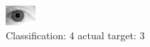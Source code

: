 \begin{figure}[h!]
\begin{center}
\includegraphics[width=0.60\columnwidth]{figures/ID2113_class_4_target_3.png}
\end{center}
\caption{ Classification: 4 actual target: 3}
\label{fig:ID2113_class_4_target_3}
\end{figure}
